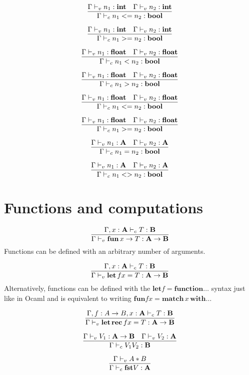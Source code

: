 \documentclass{article}
\begin{document}
\[\infer{\Gamma \vdash_c n_1 <= n_2:\mathbf{bool}}{\Gamma \vdash_v n_1: \mathbf{int} \quad \Gamma \vdash_v n_2: \mathbf{int}}\]

\[\infer{\Gamma \vdash_c n_1 >= n_2:\mathbf{bool}}{\Gamma \vdash_v n_1: \mathbf{int} \quad \Gamma \vdash_v n_2: \mathbf{int}}\]

\[\infer{\Gamma \vdash_c n_1 < n_2:\mathbf{bool}}{\Gamma \vdash_v n_1: \mathbf{float} \quad \Gamma \vdash_v n_2: \mathbf{float}}\]

\[\infer{\Gamma \vdash_c n_1 > n_2:\mathbf{bool}}{\Gamma \vdash_v n_1: \mathbf{float} \quad \Gamma \vdash_v n_2: \mathbf{float}}\]

\[\infer{\Gamma \vdash_c n_1 <= n_2:\mathbf{bool}}{\Gamma \vdash_v n_1: \mathbf{float} \quad \Gamma \vdash_v n_2: \mathbf{float}}\]

\[\infer{\Gamma \vdash_c n_1 >= n_2:\mathbf{bool}}{\Gamma \vdash_v n_1: \mathbf{float} \quad \Gamma \vdash_v n_2: \mathbf{float}}\]

\[\infer{\Gamma \vdash_c n_1 = n_2:\mathbf{bool}}{\Gamma \vdash_v n_1: \mathbf{A} \quad \Gamma \vdash_v n_2: \mathbf{A}}\]

\[\infer{\Gamma \vdash_c n_1 <> n_2:\mathbf{bool}}{\Gamma \vdash_v n_1: \mathbf{A} \quad \Gamma \vdash_v n_2: \mathbf{A}}\]

\section{Functions and computations}

\[\infer{\Gamma \vdash_v \mathbf{fun}\,x \to T:\mathbf{A\to B}}{\Gamma,x:\mathbf{A} \vdash_c T: \mathbf{B}}\]
Functions can be defined with an arbitrary number of arguments.

\[\infer{\Gamma \vdash_v \mathbf{let}\,f x = T:\mathbf{A\to B}}{\Gamma,x:\mathbf{A} \vdash_c T: \mathbf{B}}\]
Alternatively, functions can be defined with the $\mathbf{let} f = \mathbf{function} \dots$ syntax just like in Ocaml and is equivalent to writing $\mathbf{fun} f x = \mathbf{match} \,x\, \mathbf{with} \dots$

\[\infer{\Gamma \vdash_v \mathbf{let} \, \mathbf{rec}\,f x = T:\mathbf{A\to B}}{\Gamma,f:A\to B,x:\mathbf{A} \vdash_c T: \mathbf{B}}\]

\[\infer{\Gamma \vdash_c V_1V_2:\mathbf{B}}{\Gamma \vdash_v V_1: \mathbf{A\to B} \quad \Gamma \vdash_v V_2:\mathbf{A}}\]

\[\infer{\Gamma \vdash_c \mathbf{fst} V:\mathbf{A}}{\Gamma \vdash_v A*B}\]
\end{document}
